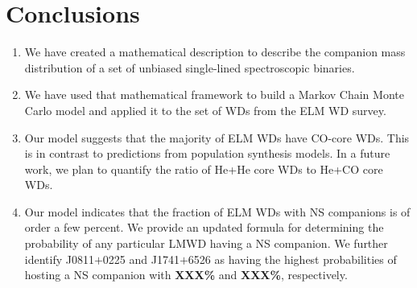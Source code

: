 \documentclass[letterpaper,12pt,preprint]{aastex}
\newcommand{\Msun}{\ifmmode {{\rm M}_{\odot}}\else M$_{\odot}$\fi}
\begin{document}


\section{Conclusions}

\begin{enumerate}
\item We have created a mathematical description to describe the companion mass distribution of a set of unbiased single-lined spectroscopic binaries. \\
\item We have used that mathematical framework to build a Markov Chain Monte Carlo model and applied it to the set of WDs from the ELM WD survey. \\
\item Our model suggests that the majority of ELM WDs have CO-core WDs. This is in contrast to predictions from population synthesis models. In a future work, we plan to quantify the ratio of He+He core WDs to He+CO core WDs. \\
\item Our model indicates that the fraction of ELM WDs with NS companions is of order a few percent. We provide an updated formula for determining the probability of any particular LMWD having a NS companion. We further identify J0811$+$0225 and J1741$+$6526 as having the highest probabilities of hosting a NS companion with {\bf XXX\%} and {\bf XXX\%}, respectively. \\
\end{enumerate}
\end{document}
